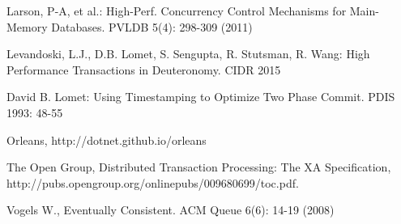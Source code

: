 \documentclass[11pt]{article}
\begin{document}
\begin{thebibliography}{10}
\begin{small}
Larson, P-A, et al.: High-Perf. Concurrency Control Mechanisms for Main-Memory Databases. PVLDB 5(4): 298-309 (2011) 

Levandoski, L.J., D.B. Lomet, S. Sengupta, R. Stutsman, R. Wang: High Performance Transactions in Deuteronomy. CIDR 2015 

David B. Lomet: Using Timestamping to Optimize Two Phase Commit. PDIS 1993: 48-55 

Orleans, http://dotnet.github.io/orleans 

The Open Group, Distributed Transaction Processing: The XA Specification, http://pubs.opengroup.org/onlinepubs/009680699/toc.pdf. 

Vogels W., Eventually Consistent. ACM Queue 6(6): 14-19 (2008) \end{small}
\end{thebibliography}
\end{document}
